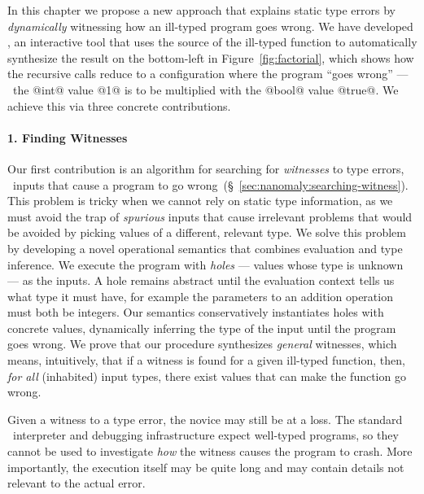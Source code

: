 In this chapter we propose a new approach that explains static type
errors by \emph{dynamically} witnessing how an ill-typed program goes
wrong.
%
We have developed \toolname, an interactive tool that uses
the source of the ill-typed function to automatically synthesize
the result on the bottom-left in Figure~\ref{fig:factorial}, which
shows how the recursive calls reduce to a configuration where
the program ``goes wrong'' --- \ie\ the @int@ value @1@ is to be
multiplied with the @bool@ value @true@.
We achieve this via three concrete contributions.

\paragraph{1. Finding Witnesses}
Our first contribution is an algorithm for searching for
\emph{witnesses} to type errors, \ie\ inputs that cause a
program to go wrong~(\S~\ref{sec:nanomaly:searching-witness}).
%
This problem is tricky when we cannot rely on
static type information, as we must avoid the
trap of \emph{spurious} inputs that cause
irrelevant problems that would be avoided
by picking values of a different, relevant type.
%
We solve this problem by developing a novel
operational semantics that combines evaluation
and type inference.
%
We execute the program with \emph{holes} --- values whose type is
unknown --- as the inputs.
%
A hole remains abstract until the evaluation
context tells us what type it must have, for
example the parameters to an addition operation
must both be integers.
%
Our semantics conservatively instantiates holes
with concrete values, dynamically inferring the
type of the input until the program goes wrong.
%
We prove that our procedure synthesizes \emph{general}
witnesses, which means, intuitively, that if a witness
is found for a given ill-typed function, then, \emph{for all}
(inhabited) input types, there exist values that can make
the function go wrong.

Given a witness to a type error, the novice may still be at a loss.
%
The standard \ocaml\ interpreter and debugging infrastructure expect
well-typed programs, so they cannot be used to investigate \emph{how}
the witness causes the program to crash.
%
More importantly, the execution itself may be quite long and may contain
details not relevant to the actual error.

